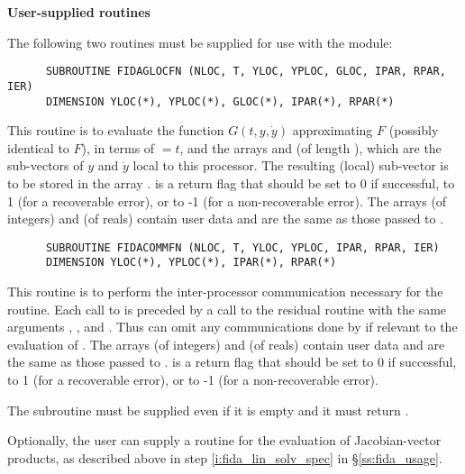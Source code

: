 \begin{Steps}
\item {\bf User-supplied routines}

  The following two routines must be supplied for use with the {\idabbdpre}
  module:
\begin{verbatim}
      SUBROUTINE FIDAGLOCFN (NLOC, T, YLOC, YPLOC, GLOC, IPAR, RPAR, IER)
      DIMENSION YLOC(*), YPLOC(*), GLOC(*), IPAR(*), RPAR(*)
\end{verbatim}
  This routine is to evaluate the function $G(t,y,\dot{y})$ approximating $F$
  (possibly identical to $F$), in terms of  $ = t$, and the arrays
   and  (of length ), which are the sub-vectors
  of $y$ and $\dot{y}$ local to this processor.  The resulting (local) sub-vector
  is to be stored in the array .   is a return flag that
  should be set to 0 if successful, to 1 (for a recoverable error), or to
  -1 (for a non-recoverable error).
  The arrays  (of integers) and  (of reals) contain user data
  and are the same as those passed to .

\begin{verbatim}
      SUBROUTINE FIDACOMMFN (NLOC, T, YLOC, YPLOC, IPAR, RPAR, IER)
      DIMENSION YLOC(*), YPLOC(*), IPAR(*), RPAR(*)
\end{verbatim}
  This routine is to perform the inter-processor communication necessary
  for the  routine.
  Each call to  is preceded by a call to the residual routine
   with the same arguments , , and .
  Thus  can omit any communications done by  if
  relevant to the evaluation of .
  The arrays  (of integers) and  (of reals) contain user data
  and are the same as those passed to .
   is a return flag that should be set to 0 if successful, to 1
  (for a recoverable error), or to -1 (for a non-recoverable error).

  {\warn}The subroutine  must be supplied even if it is empty and it must
  return .

  Optionally, the user can supply a routine  for the evaluation of
  Jacobian-vector products, as described above in step \ref{i:fida_lin_solv_spec}
  in \S\ref{ss:fida_usage}.

\end{Steps}
